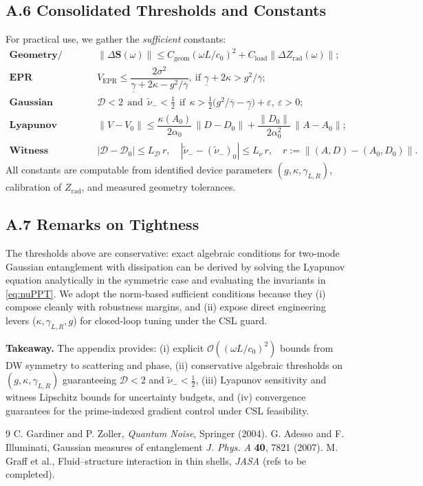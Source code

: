 \documentclass[11pt]{article}
\begin{document}
\subsection*{A.6 Consolidated Thresholds and Constants}
For practical use, we gather the \emph{sufficient} constants:
\begin{align}
\textbf{Geometry/Loading:}\quad & \|\Delta \mathbf S(\omega)\| \le C_{\mathrm{geom}}(\omega L/c_0)^2 + C_{\mathrm{load}}\|\Delta Z_{\mathrm{rad}}(\omega)\|;
\\
\textbf{EPR Contraction:}\quad & V_{\mathrm{EPR}} \le \dfrac{2\sigma^2}{\underline\gamma + 2\kappa - g^2/\overline\gamma},\ \text{if }\underline\gamma + 2\kappa > g^2/\overline\gamma;
\\
\textbf{Gaussian Entanglement:}\quad 
& \mathcal D < 2\ \ \text{and}\ \ \tilde\nu_-<\tfrac12\ \ \text{if}\ \ \kappa>\tfrac12\big(g^2/\overline\gamma - \underline\gamma\big)+\varepsilon,\ \varepsilon>0;
\\
\textbf{Lyapunov Sensitivity:}\quad &
\|V - V_0\|\le \dfrac{\kappa(A_0)}{2\alpha_0}\,\|D-D_0\| + \dfrac{\|D_0\|}{2\alpha_0^2}\,\|A-A_0\|;
\\
\textbf{Witness Lipschitz:}\quad &
|\mathcal D - \mathcal D_0| \le L_{\mathcal D}\, r,\quad |\tilde\nu_- - (\tilde\nu_-)_0| \le L_{\nu}\, r,\quad r:=\|(A,D)-(A_0,D_0)\|.
\end{align}
All constants are computable from identified device parameters $(g,\kappa,\gamma_{L,R})$, calibration of $Z_{\mathrm{rad}}$, and measured geometry tolerances.

\subsection*{A.7 Remarks on Tightness}
The thresholds above are conservative: exact algebraic conditions for two-mode Gaussian entanglement with dissipation can be derived by solving the Lyapunov equation analytically in the symmetric case and evaluating the invariants in \eqref{eq:nuPPT}. We adopt the norm-based sufficient conditions because they (i) compose cleanly with robustness margins, and (ii) expose direct engineering levers ($\kappa,\gamma_{L,R},g$) for closed-loop tuning under the CSL guard.

\bigskip
\noindent\textbf{Takeaway.} The appendix provides: (i) explicit $\mathcal O((\omega L/c_0)^2)$ bounds from DW symmetry to scattering and phase, (ii) conservative algebraic thresholds on $(g,\kappa,\gamma_{L,R})$ guaranteeing $\mathcal D<2$ and $\tilde\nu_-<\tfrac12$, (iii) Lyapunov sensitivity and witness Lipschitz bounds for uncertainty budgets, and (iv) convergence guarantees for the prime-indexed gradient control under CSL feasibility.



\begin{thebibliography}{9}
 C. Gardiner and P. Zoller, \emph{Quantum Noise}, Springer (2004).
 G. Adesso and F. Illuminati, Gaussian measures of entanglement \emph{J. Phys. A} \textbf{40}, 7821 (2007).
 M. Graff et al., Fluid--structure interaction in thin shells, \emph{JASA} (refs to be completed).
\end{thebibliography}
\end{document}
